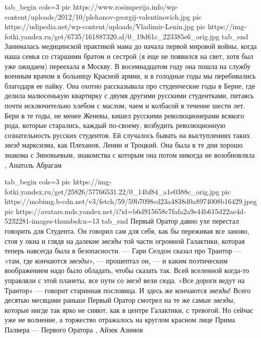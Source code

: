 \ifcmt
  tab_begin cols=3
     pic https://www.rosimperija.info/wp-content/uploads/2012/10/plehanov-georgij-valentinovich.jpg
		 pic https://udipedia.net/wp-content/uploads/Vladimir-Lenin.jpg
		 pic https://img-fotki.yandex.ru/get/6735/161887320.af/0_19d61c_223385e6_orig.jpg
  tab_end
\fi
Занималась медицинской практикой мама до начала первой мировой войны, когда
наша семья со старшими братом и сестрой (я еще не появился на свет, хотя был
уже ожидаем) переехала в Москву. В восемнадцатом году она пошла на службу
военным врачом в больницу Красной армии, и в голодные годы мы перебивались
благодаря ее пайку. Она охотно рассказывала про студенческие годы в Берне, где
делила малюсенькую квартирку с двумя другими русскими студентками, питаясь
почти исключительно хлебом с маслом, чаем и колбасой в течение шести лет. Берн
в те годы, не менее Женевы, кишел русскими революционерами всякого рода,
которые старались, каждый по-своему, возбудить революционную сознательность
русских студентов. Ей случалось бывать на выступлениях таких \emph{звезд} марксизма,
как Плеханов, Ленин и Троцкий. Она была в те дни хорошо знакома с Зиновьевым,
знакомства с которым она потом никогда не возобновляла
, Анатоль Абрагам

\ifcmt
  tab_begin cols=3
		 pic https://img-fotki.yandex.ru/get/25826/57766531.22/0_14bf84_a1e0388c_orig.jpg
     pic https://mobimg.b-cdn.net/v3/fetch/59/59b7098cd23a4838d0a8974008b16429.jpeg
		 pic https://avatars.mds.yandex.net/i?id=b6d915658c7fafa2a9e44b615d22ae4d-5232281-images-thumbs&n=13
  tab_end
\fi
Первый Оратор давно ухе перестал говорить для Студента. Он говорил сам для
себя, как бы переживая все заново, стоя у окна и глядя на далекие \emph{звезды}
той части огромной Галактики, которая теперь навсегда была в безопасности.  —
Гари Селдон сказал про Трантор — «там, где кончаются \emph{звезды}», —
прошептал он, — и каким поэтическим воображением надо было обладать, чтобы
сказать так. Всей вселенной когда-то управляли с этой планеты, все пути со
\emph{звезд} вели сюда. «Все дороги ведут на Трантор» — говорит старинная
пословица. И здесь же кончаются \emph{звезды}!  Всего десятью месяцами раньше
Первый Оратор смотрел на те же самые \emph{звезды}, которые нигде так ярко не
сияют, как в центре Галактики, с тревогой.  Но сейчас уже не волнение, а
торжество отражалось на круглом красном лице Прима Палвера — Первого Оратора
, Айзек Азимов

